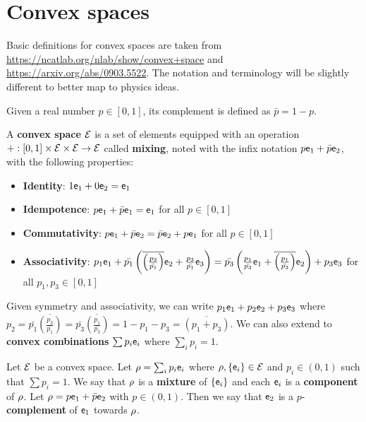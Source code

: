 \section{Convex spaces}

Basic definitions for convex spaces are taken from \url{https://ncatlab.org/nlab/show/convex+space} and \url{https://arxiv.org/abs/0903.5522}. The notation and terminology will be slightly different to better map to physics ideas. 

\begin{defn}
	Given a real number $p \in [0,1]$, its complement is defined as $\bar{p} = 1-p$.
\end{defn}

\begin{defn}
	A \textbf{convex space} $\Ens$ is a set of elements equipped with an operation $+ : [0, 1] \times \Ens \times \Ens \to \Ens$ called \textbf{mixing}, noted with the infix notation $p \ens_1 + \bar{p} \ens_2$, with the following properties:
	\begin{itemize}
		\item \textbf{Identity}: $1 \ens_1 + 0 \ens_2 = \ens_1$
		\item \textbf{Idempotence}:  $p \ens_1 + \bar{p} \ens_1 = \ens_1$ for all $p \in [0,1]$
		\item \textbf{Commutativity}: $p \ens_1 + \bar{p} \ens_2 = \bar{p} \ens_2 + p \ens_1$ for all $p \in [0,1]$
		\item \textbf{Associativity}: $p_1 \ens_1 + \bar{p_1}\left(\overline{\left(\frac{p_3}{\bar{p_1}}\right)}\ens_2 + \frac{p_3}{\bar{p_1}}\ens_3\right) =  \bar{p_3}\left(\frac{p_1}{\bar{p_3}} \ens_1 +  \overline{\left(\frac{p_1}{\bar{p_3}}\right)}\ens_2\right) + p_3 \ens_3$ for all $p_1, p_3 \in [0,1]$
	\end{itemize}
	Given symmetry and associativity, we can write $p_1 \ens_1 + p_2 \ens_2 + p_3 \ens_3$ where $p_2 = \bar{p_1}\overline{\left(\frac{p_3}{\bar{p_1}}\right)} = \bar{p_3}\overline{\left(\frac{p_1}{\bar{p_3}}\right)} = 1 - p_1 - p_3 = \overline{\left(p_1 + p_3\right)}$. We can also extend to \textbf{convex combinations} $\sum p_i \ens_i$ where $\sum_i p_i = 1$.
\end{defn}


\begin{defn}
	Let $\Ens$ be a convex space. Let $\ens[\rho] = \sum_i p_i \ens_i$ where $\ens[\rho], \{\ens_i\} \in \Ens$ and $p_i \in (0,1)$ such that $\sum p_i = 1$. We say that $\ens[\rho]$ is a \textbf{mixture} of $\{\ens_i\}$ and each $\ens_i$ is a \textbf{component} of $\ens[\rho]$. Let $\ens[\rho] = p \ens_1 + \bar{p} \ens_2$ with $p \in (0,1)$. Then we say that $\ens_2$ is a $p$-\textbf{complement} of $\ens_1$ towards $\ens[\rho]$.
\end{defn}


